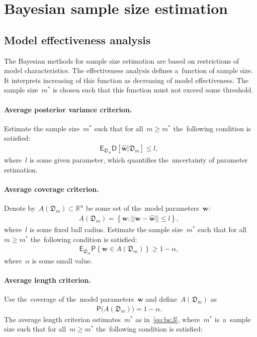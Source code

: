 \documentclass[
11pt,%
tightenlines,%
twoside,%
onecolumn,%
nofloats,%
nobibnotes,%
nofootinbib,%
superscriptaddress,%
noshowpacs,%
centertags]%
{revtex4}
\begin{document}
\section{Bayesian sample size estimation}
\subsection{Model effectiveness analysis}
The Bayesian methods for sample size estimation are based on restrictions of model characteristics. The effectiveness analysis defines a~function of sample size. It interprets increasing of this function as decreasing of model effectiveness. The sample size~$m^*$ is chosen such that this function must not exceed some threshold.

\paragraph{Average posterior variance criterion.}
Estimate the sample size~$m^*$ such that for all~$m \geq m^*$ the~following condition is satisfied:
\[
\label{eq:bs:1}
\begin{aligned}
	\mathsf{E}_{\mathfrak{D}_m}\mathsf{D}\left[\hat{\mathbf{w}}|\mathfrak{D}_m\right] \leq l,
\end{aligned}
\]
where~$l$ is some given parameter, which quantifies the~uncertainty of parameter estimation.

\paragraph{Average coverage criterion.}
Denote by~$A\left(\mathfrak{D}_{m}\right) \subset \mathbb{R}^n$ be some set of the~model parameters~$\mathbf{w}$:
\[
\label{eq:bs:2}
\begin{aligned}
	A\left(\mathfrak{D}_{m}\right) = \left\{\mathbf{w}:||\mathbf{w} - \hat{\mathbf{w}}||\leq l\right\},
\end{aligned}
\]
where~$l$ is some fixed ball radius. Estimate the sample size~$m^*$ such that for all~$m \geq m^*$ the~following condition is satisfied:
\[
\label{eq:bs:3}
\begin{aligned}
	\mathsf{E}_{\mathfrak{D}_m}\mathsf{P}\left\{\mathbf{w} \in A\left(\mathfrak{D}_m\right)\right\} \geq 1-\alpha,
\end{aligned}
\]
where~$\alpha$ is some small value.
	
\paragraph{Average length criterion.}
Use the~coverage of the~model parameters~$\mathbf{w}$ and define~$A\left(\mathfrak{D}_{m}\right)$ as
\[
\label{eq:bs:4}
\begin{aligned}
	\mathsf{P}\bigl(A\left(\mathfrak{D}_{m}\right)\bigr) = 1- \alpha.
\end{aligned}
\]
The average length criterion estimates~$m^*$ as in~\eqref{eq:bs:3}, where~$m^*$ is~a~sample size such that for all~$m \geq m^*$ the~following condition is satisfied:
	
\end{document}
